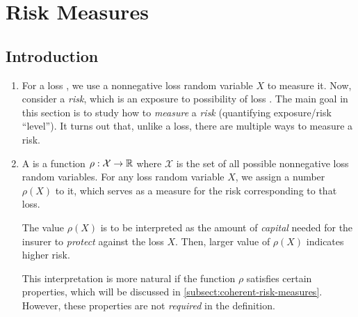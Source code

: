 \section{Risk Measures}
\label{sect:risk-measures}
\subsection{Introduction}
\begin{enumerate}
\item For a loss , we use a nonnegative loss random variable
\(X\) to measure it. Now, consider a \emph{risk}, which is an exposure to
possibility of loss . The main goal in this section is to
study how to \emph{measure} a \emph{risk} (quantifying exposure/risk
``level'').  It turns out that, unlike a loss, there are multiple ways to
measure a risk.

\item A  is a function \(\rho:\mathcal{X}\to\mathbb{R}\) where
\(\mathcal{X}\) is the set of all possible nonnegative loss random variables.
For any loss random variable \(X\), we assign a number \(\rho(X)\) to it, which
serves as a measure for the risk corresponding to that loss.

The value \(\rho(X)\) is to be interpreted as the amount of \emph{capital}
needed for the insurer  to \emph{protect} 
against the loss \(X\). Then, larger value of \(\rho(X)\) indicates higher
risk.

\begin{note}
This interpretation is more natural if the function \(\rho\) satisfies certain
properties, which will be discussed in \cref{subsect:coherent-risk-measures}.
However, these properties are not \emph{required} in the definition.
\end{note}
\end{enumerate}
